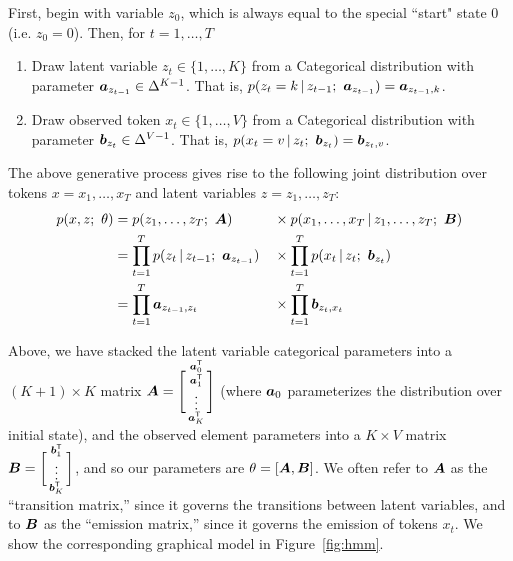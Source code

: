 \documentclass{article}
\begin{document}
First, begin with variable $z_0$, which is always equal to the special ``start" state $0$ (i.e. $z_0 = 0$). Then, for $t = 1, \ldots, T$
\begin{enumerate}
    \item Draw latent variable $z_t \in \{1, \ldots, K\}$ from a Categorical distribution with parameter $\boldsymbol{a}_{z_{t-1}} \in \Delta^{K-1}$. That is, $p(z_t = k \,|\, z_{t-1}; \ \boldsymbol{a}_{z_{t-1}}) = \boldsymbol{a}_{z_{t-1}, k}$.
    \item Draw observed token $x_t \in \{1, \ldots, V\}$ from a Categorical distribution with parameter $\boldsymbol{b}_{z_{t}} \in \Delta^{V-1}$. That is, $p(x_t = v \,|\, z_{t}; \ \boldsymbol{b}_{z_{t}}) = \boldsymbol{b}_{z_{t}, v}$.
\end{enumerate}

The above generative process gives rise to the following joint distribution over tokens $x = x_1, \ldots, x_T$ and latent variables $z = z_1, \ldots, z_T$:
\begin{alignat}{2} \label{eq:hmm}
    p(x, z; \ \theta) &= p(z_1, \ldots, z_T ; \ \boldsymbol{A}) &&\times p(x_1, \ldots, x_T \,|\, z_1, \ldots, z_T ; \ \boldsymbol{B}) \nonumber \\
    &= \prod_{t=1}^T p(z_t \,|\, z_{t-1} ; \ \boldsymbol{a}_{z_{t-1}}) &&\times \prod_{t=1}^T p(x_t \,|\, z_{t} ; \ \boldsymbol{b}_{z_{t}}) \nonumber \\ 
    &= \prod_{t=1}^T \boldsymbol{a}_{z_{t-1}, z_t} &&\times \prod_{t=1}^T \boldsymbol{b}_{z_{t}, x_t}
\end{alignat}

Above, we have stacked the latent variable categorical parameters into a $(K+1) \times K$ matrix $\boldsymbol{A} = \Biggl[ \begin{smallmatrix} \boldsymbol{a}_0^{\mathsf{T}} \\ \boldsymbol{a}_1^{\mathsf{T}} \\ \vdots \\ \boldsymbol{a}_K^{\mathsf{T}}  \end{smallmatrix} \Biggr]$ (where $\boldsymbol{a}_0$ parameterizes the distribution over initial state), and the observed element parameters into a $K \times V$ matrix $\boldsymbol{B} = \biggl[ \begin{smallmatrix} \boldsymbol{b}_1^{\mathsf{T}} \\ \vdots \\ \boldsymbol{b}_K^{\mathsf{T}}  \end{smallmatrix} \biggr]$, and so our parameters are $\theta = [\boldsymbol{A}, \boldsymbol{B}]$. We often refer to $\boldsymbol{A}$ as the ``transition matrix,'' since it governs the transitions between latent variables, and to $\boldsymbol{B}$ as the ``emission matrix,'' since it governs the emission of tokens $x_t$. We show the corresponding graphical model in Figure~\ref{fig:hmm}.
\end{document}
